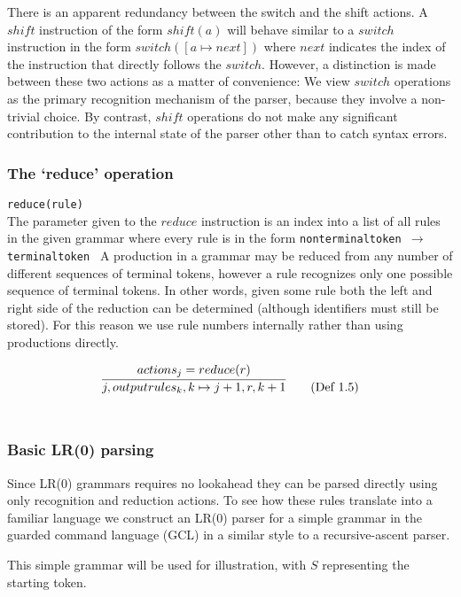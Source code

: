 \documentclass[a4paper,11pt]{article}
\begin{document}
There is an apparent redundancy between the switch and the shift actions. 
A $shift$ instruction of the form $shift(a)$ will behave similar to a $switch$ instruction in the form $switch([a \mapsto next])$ where $next$ indicates the index of the instruction that directly follows the $switch$.
However, a distinction is made between these two actions as a matter of convenience: 
We view $switch$ operations as the primary recognition mechanism of the parser, because they involve a non-trivial choice.
By contrast, $shift$ operations do not make any significant contribution to the internal state of the parser other than to catch syntax errors.
	
\subsubsection{The `reduce' operation}
\texttt{reduce(rule)}\\
The parameter given to the $reduce$ instruction is an index into a list of all rules in the given grammar where every rule is in the form \texttt{nonterminaltoken $\rightarrow$ terminaltoken \textellipsis}
A production in a grammar may be reduced from any number of different sequences of terminal tokens, however a rule recognizes only one possible sequence of terminal tokens.
In other words, given some rule both the left and right side of the reduction can be determined (although identifiers must still be stored).
For this reason we use rule numbers internally rather than using productions directly.

\begin{equation}
\infer{j, outputrules_k, k \mapsto j+1, r, k+1}{actions_j = reduce(r)} \tag{Def 1.5}
\end{equation}\\

\subsubsection{Basic LR(0) parsing}

Since LR(0) grammars requires no lookahead they can be parsed directly using only recognition and reduction actions.
To see how these rules translate into a familiar language we construct an LR(0) parser for a simple grammar in the guarded command language (GCL) in a similar style to a recursive-ascent parser.

This simple grammar will be used for illustration, with $S$ representing the starting token.
\end{document}
